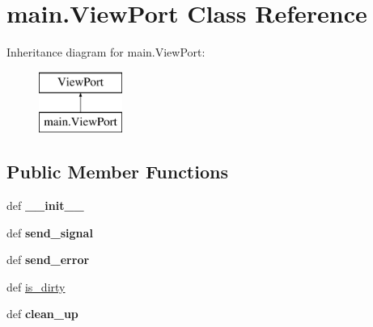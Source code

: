 \hypertarget{classmain_1_1ViewPort}{\section{main.\+View\+Port Class Reference}
\label{classmain_1_1ViewPort}
}
Inheritance diagram for main.\+View\+Port\+:\begin{figure}[H]
\begin{center}
\leavevmode
\includegraphics[height=2.000000cm]{classmain_1_1ViewPort}
\end{center}
\end{figure}
\subsection*{Public Member Functions}
\begin{DoxyCompactItemize}
\item 
\hypertarget{classmain_1_1ViewPort_ac5daf01cc84f0883a66c2ec10c33d79c}{def {\bfseries \+\_\+\+\_\+init\+\_\+\+\_\+}}\label{classmain_1_1ViewPort_ac5daf01cc84f0883a66c2ec10c33d79c}

\item 
\hypertarget{classmain_1_1ViewPort_adb11a14a14b2f6e094f714c14b7a58db}{def {\bfseries send\+\_\+signal}}\label{classmain_1_1ViewPort_adb11a14a14b2f6e094f714c14b7a58db}

\item 
\hypertarget{classmain_1_1ViewPort_af36f4fe1b2939d856da39d374ffbf9db}{def {\bfseries send\+\_\+error}}\label{classmain_1_1ViewPort_af36f4fe1b2939d856da39d374ffbf9db}

\item 
def \hyperlink{classmain_1_1ViewPort_a5652106d953c961d92bf96b32e4130b0}{is\+\_\+dirty}
\item 
\hypertarget{classmain_1_1ViewPort_a52a551b8a04099982f77b590289202b3}{def {\bfseries clean\+\_\+up}}\label{classmain_1_1ViewPort_a52a551b8a04099982f77b590289202b3}

\end{DoxyCompactItemize}
